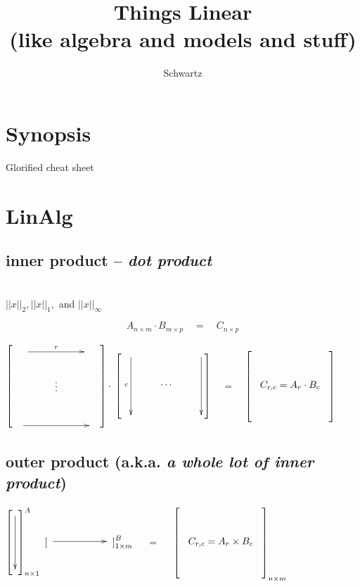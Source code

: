 \documentclass[11pt, oneside]{article}
\title{Things Linear\\
\Large (like algebra and models and stuff)}
\author{Schwartz} %
\begin{document}
\maketitle

\section{Synopsis}
Glorified cheat sheet

\section{LinAlg}

\subsection{inner product -- \emph{dot product}}

${}$\\
\noindent $||x||_2, ||x||_1,$ and $||x||_\infty$%


$$A_{n\times m} \cdot B_{m\times p} \quad = \quad C_{n\times p}$$

\hspace{1em}$\left[
\vcenter{\xymatrix{
\quad\ar[rr]^r &  & \quad \\
& \vdots &\\
\ar[rr] &  &  \\}}
\right] \cdot $
$\left[
\vcenter{\xymatrix{
\ar[dd]_c &  & \ar[dd] \\
& \cdots &\\
  &  &  \\}}
\right] 
$$\quad=\quad$$\left[
\vcenter{\xymatrix{
  \\
\;\; C_{r,c} = A_{r} \cdot B_{c} \;\; \\ %
  \\}}
\right]$


\subsection{outer product (a.k.a. \emph{a whole lot of inner product}) } 

  
\hspace{8em} $\left[
\vcenter{\xymatrix{
\ar[dd]\\
\\
\\}}
\right]^A_{n\times 1}$
$\left[\vcenter{\xymatrix{
\ar[rr] &  &  \\}}
\right]^B_{1\times m} $
$\quad=\quad$
$\left[
\vcenter{\xymatrix{
 \\
\;\; C_{r,c} = A_{r} \times B_{c} \;\; \\
  \\}}
\right]_{n\times m} $ 
    
\end{document}
